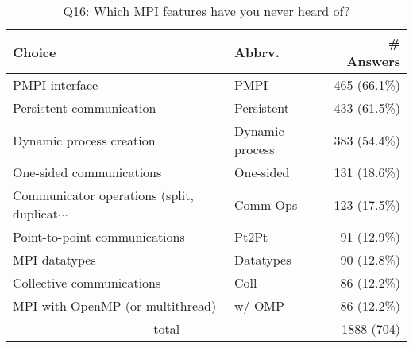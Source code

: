 \begin{table}[htb]%
\begin{center}%
\caption{Q16: Which MPI features have you never heard of?}%
\label{tab:Q16-ans}%
\begin{tabular}{l|l|r}%
\hline%
Choice & Abbrv. & \# Answers \\%
\hline%
PMPI interface & PMPI & 465 (66.1\%) \\%
Persistent communication & Persistent & 433 (61.5\%) \\%
Dynamic process creation & Dynamic process & 383 (54.4\%) \\%
One-sided communications & One-sided & 131 (18.6\%) \\%
{\small Communicator operations (split, duplicat$\cdots$} & Comm Ops & 123 (17.5\%) \\%
Point-to-point communications & Pt2Pt & 91 (12.9\%) \\%
MPI datatypes & Datatypes & 90 (12.8\%) \\%
Collective communications & Coll & 86 (12.2\%) \\%
MPI with OpenMP (or multithread) & w/ OMP & 86 (12.2\%) \\%
\hline%
\multicolumn{2}{c}{total} & 1888 (704)\\%
\hline%
\end{tabular}%
\end{center}%
\end{table}%
